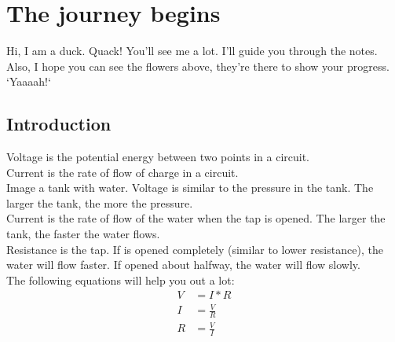 \documentclass[14pt]{memoir}
\begin{document}

\setlength{\parskip}{1.5\baselineskip}
\setlength{\parindent}{0pt}
\chapter{The journey begins}
Hi, I am a duck. Quack! You'll see me a lot. I'll guide you
through the notes. Also, I hope you can see the flowers above,
they're there to show your progress. `Yaaaah!`

\section*{Introduction}
Voltage is the potential energy between two points in a circuit.
\\
Current is the rate of flow of charge in a circuit.
\\
Image a tank with water. Voltage is similar to the pressure in the
tank. The larger the tank, the more the pressure.
\\
Current is the rate of flow of the water when the tap is opened.
The larger the tank, the faster the water flows.
\\
Resistance is the tap. If is opened completely (similar to lower
resistance), the water will flow faster. If opened about halfway,
the water will flow slowly.
\\
The following equations will help you out a lot:
\begin{align}
    V &= I * R \\
    I &= \frac{V}{R}\\
    R &= \frac{V}{I}
\end{align}
\end{document}
